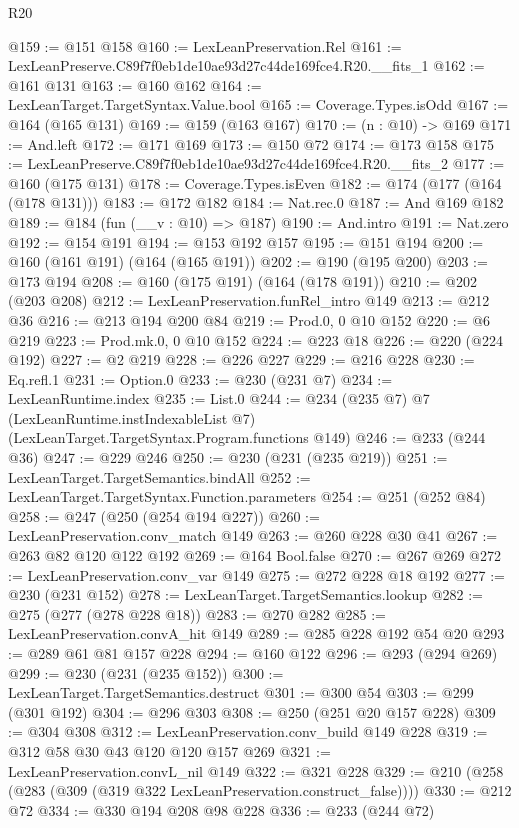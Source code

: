 \begin{lexlean}{R20}
\begin{coremodule}
@159 := @151 @158
@160 := LexLeanPreservation.Rel
@161 := LexLeanPreserve.C89f7f0eb1de10ae93d27c44de169fce4.R20.__fits_1
@162 := @161 @131
@163 := @160 @162
@164 := LexLeanTarget.TargetSyntax.Value.bool
@165 := Coverage.Types.isOdd
@167 := @164 (@165 @131)
@169 := @159 (@163 @167)
@170 := (n : @10) -> @169
@171 := And.left
@172 := @171 @169
@173 := @150 @72
@174 := @173 @158
@175 := LexLeanPreserve.C89f7f0eb1de10ae93d27c44de169fce4.R20.__fits_2
@177 := @160 (@175 @131)
@178 := Coverage.Types.isEven
@182 := @174 (@177 (@164 (@178 @131)))
@183 := @172 @182
@184 := Nat.rec.{0}
@187 := And @169 @182
@189 := @184 (fun (__v : @10) => @187)
@190 := And.intro
@191 := Nat.zero
@192 := @154 @191
@194 := @153 @192 @157
@195 := @151 @194
@200 := @160 (@161 @191) (@164 (@165 @191))
@202 := @190 (@195 @200)
@203 := @173 @194
@208 := @160 (@175 @191) (@164 (@178 @191))
@210 := @202 (@203 @208)
@212 := LexLeanPreservation.funRel_intro @149
@213 := @212 @36
@216 := @213 @194 @200 @84
@219 := Prod.{0, 0} @10 @152
@220 := @6 @219
@223 := Prod.mk.{0, 0} @10 @152
@224 := @223 @18
@226 := @220 (@224 @192)
@227 := @2 @219
@228 := @226 @227
@229 := @216 @228
@230 := Eq.refl.{1}
@231 := Option.{0}
@233 := @230 (@231 @7)
@234 := LexLeanRuntime.index
@235 := List.{0}
@244 := @234
    (@235 @7)
    @7
    (LexLeanRuntime.instIndexableList @7)
    (LexLeanTarget.TargetSyntax.Program.functions @149)
@246 := @233 (@244 @36)
@247 := @229 @246
@250 := @230 (@231 (@235 @219))
@251 := LexLeanTarget.TargetSemantics.bindAll
@252 := LexLeanTarget.TargetSyntax.Function.parameters
@254 := @251 (@252 @84)
@258 := @247 (@250 (@254 @194 @227))
@260 := LexLeanPreservation.conv_match @149
@263 := @260 @228 @30 @41
@267 := @263 @82 @120 @122 @192
@269 := @164 Bool.false
@270 := @267 @269
@272 := LexLeanPreservation.conv_var @149
@275 := @272 @228 @18 @192
@277 := @230 (@231 @152)
@278 := LexLeanTarget.TargetSemantics.lookup
@282 := @275 (@277 (@278 @228 @18))
@283 := @270 @282
@285 := LexLeanPreservation.convA_hit @149
@289 := @285 @228 @192 @54 @20
@293 := @289 @61 @81 @157 @228
@294 := @160 @122
@296 := @293 (@294 @269)
@299 := @230 (@231 (@235 @152))
@300 := LexLeanTarget.TargetSemantics.destruct
@301 := @300 @54
@303 := @299 (@301 @192)
@304 := @296 @303
@308 := @250 (@251 @20 @157 @228)
@309 := @304 @308
@312 := LexLeanPreservation.conv_build @149 @228
@319 := @312 @58 @30 @43 @120 @120 @157 @269
@321 := LexLeanPreservation.convL_nil @149
@322 := @321 @228
@329 := @210 (@258 (@283 (@309 (@319 @322 LexLeanPreservation.construct_false))))
@330 := @212 @72
@334 := @330 @194 @208 @98 @228
@336 := @233 (@244 @72)

\end{coremodule}
\end{lexlean}
